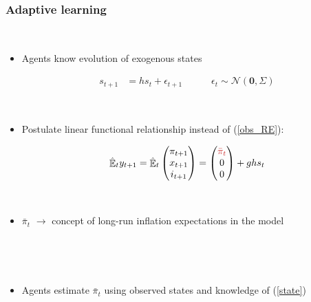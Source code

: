 \documentclass[10pt]{beamer}
\DeclareMathOperator{\E}{\mathbb{E}}
\begin{document}
\begin{frame}
	\frametitle{Adaptive learning}
	\label{adaptive_learning}

\

\begin{itemize}
\item Agents know evolution of exogenous states

 \begin{align}
 s_{t+1} & = h s_{t} + \epsilon_{t+1} \quad \quad \quad \epsilon_t \sim \mathcal{N}(\mathbf{0},\Sigma) \label{state} 
 \end{align}


\pause

\

\item Postulate linear functional relationship instead of (\ref{obs_RE}):

\begin{equation}
\hat{\E}_t y_{t+1} = \hat{\E}_t \begin{pmatrix}\pi_{t+1} \\ x_{t+1} \\ i_{t+1} \end{pmatrix}  = \begin{pmatrix} \textcolor{brownreddark}{\bar{\pi}_{t}} \\ 0 \\ 0 \end{pmatrix} + g h s_t  \label{PLM_fcst_general}
\end{equation}


\

\pause
  


\item[] \textcolor{brownreddark}{$\bar{\pi}_{t}$}	$\rightarrow$ concept of long-run inflation expectations in the model

\


\pause

\

\item Agents estimate $\bar{\pi}_{t}$ using observed states and knowledge of (\ref{state})



\end{itemize}


\end{frame}
\end{document}
